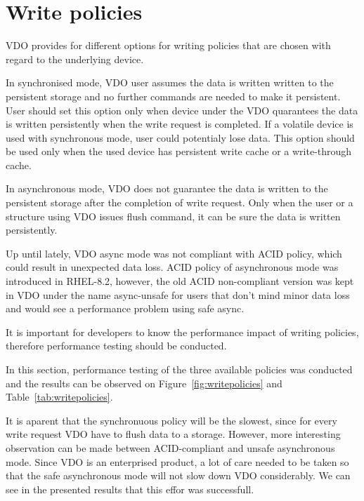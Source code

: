 \documentclass[
  color, %
  table, %
  lof,   %
  lot,   %
]{fithesis3}
\begin{document}
\clearpage

\section{Write policies}
VDO provides for different options for writing policies that are chosen with regard to the underlying device. 

In synchronised mode, VDO user assumes the data is written written to the persistent storage and no further commands are needed to make it persistent. User should set this option only when device under the VDO quarantees the data is written persistently when the write request is completed. If a volatile device is used with synchronous mode, user could potentialy lose data. This option should be used only when the used device has persistent write cache or a write-through cache.

In asynchronous mode, VDO does not guarantee the data is written to the persistent storage after the completion of write request. Only when the user or a structure using VDO issues flush command, it can be sure the data is written persistently.

Up until lately, VDO async mode was not compliant with ACID policy, which could result in unexpected data loss. ACID policy of asynchronous mode was introduced in RHEL-8.2, however, the old ACID non-compliant version was kept in VDO under the name async-unsafe for users that don't mind minor data loss and would see a performance problem using safe async.

It is important for developers to know the performance impact of writing policies, therefore performance testing should be conducted.

In this section, performance testing of the three available policies was conducted and the results can be observed on Figure~\ref{fig:writepolicies} and Table~\ref{tab:writepolicies}.

It is aparent that the synchronuous policy will be the slowest, since for every write request VDO have to flush data to a storage. However, more interesting observation can be made between ACID-compliant and unsafe asynchronous mode. Since VDO is an enterprised product, a lot of care needed to be taken so that the safe asynchronous mode will not slow down VDO considerably. We can see in the presented results that this effor was successfull.
\end{document}
